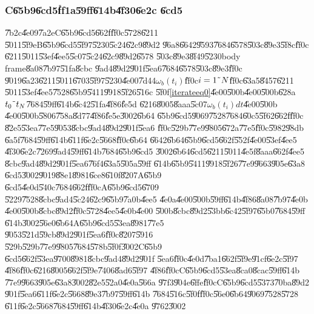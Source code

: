 \subsubsection{C\U{65b9}\U{6cd5}\U{ff1a}\U{59ff}\U{614b}\U{4f30}\U{6e2c}%
\U{6cd5}}

\U{7b2c}\U{4e09}\U{7a2e}C\U{65b9}\U{6cd5}\U{662f}\U{ff0c}\U{5728}\U{6211}%
\U{5011}\U{5f9e}B\U{65b9}\U{6cd5}\U{5f97}\U{5230}\U{5c24}\U{62c9}\U{89d2}%
\U{96a8}\U{6642}\U{9593}\U{7684}\U{6578}\U{503c}\U{89e3}\U{5f8c}\U{ff0c}%
\U{6211}\U{5011}\U{53ef}\U{4ee5}\U{5c07}\U{5c24}\U{62c9}\U{89d2}\U{6578}%
\U{503c}\U{89e3}\U{8f49}\U{5230}body frame\U{8a08}\U{7b97}\U{51fa}\U{8cbc}%
\U{9ad4}\U{89d2}\U{901f}\U{5ea6}\U{7684}\U{6578}\U{503c}\U{89e3}\U{ff0c}%
\U{9019}\U{6a23}\U{6211}\U{5011}\U{6703}\U{5f97}\U{5230}\U{4e00}\U{7d44}$%
\omega _{b}(t_{i})$\U{ff0c}$i=1\symbol{126}N$\U{ff0c}\U{63a5}\U{8457}\U{6211}%
\U{5011}\U{53ef}\U{4ee5}\U{7528}\U{65b9}\U{5411}\U{9918}\U{5f26}\U{516c}%
\U{5f0f}\ref{iterateeq0}\U{4e00}\U{500b}\U{4e00}\U{500b}\U{628a}$t_{0}%
\symbol{126}t_{N}$\U{7684}\U{59ff}\U{614b}\U{6c42}\U{51fa}\U{4f86}\U{fe5d}%
\U{6216}\U{8005}\U{8aaa}\U{5c07}$\omega _{b}(t_{i})dt$\U{4e00}\U{500b}%
\U{4e00}\U{500b}\U{5806}\U{758a}\U{8d77}\U{4f86}\U{fe5e}\U{3002}\U{6b64}%
\U{65b9}\U{6cd5}\U{9069}\U{7528}\U{7684}\U{60c5}\U{5f62}\U{662f}\U{ff0c}%
\U{82e5}\U{53ea}\U{77e5}\U{9053}\U{8cbc}\U{9ad4}\U{89d2}\U{901f}\U{5ea6}%
\U{ff0c}\U{529b}\U{77e9}\U{9805}\U{672a}\U{77e5}\U{ff0c}\U{5982}\U{98db}%
\U{6a5f}\U{7684}\U{59ff}\U{614b}\U{611f}\U{6e2c}\U{5668}\U{ff0c}\U{6b64}%
\U{6642}\U{6b64}\U{65b9}\U{6cd5}\U{662f}\U{552f}\U{4e00}\U{53ef}\U{4ee5}%
\U{4f30}\U{6e2c}\U{7269}\U{9ad4}\U{59ff}\U{614b}\U{7684}\U{65b9}\U{6cd5}%
\U{3002}\U{6b64}\U{6cd5}\U{6211}\U{5011}\U{4e5f}\U{8aaa}\U{662f}\U{4ee5}%
\U{8cbc}\U{9ad4}\U{89d2}\U{901f}\U{5ea6}\U{76f4}\U{63a5}\U{505a}\U{59ff}%
\U{614b}\U{65b9}\U{5411}\U{9918}\U{5f26}\U{77e9}\U{9663}\U{905e}\U{63a8}%
\U{6cd5}\U{3002}\U{9019}\U{88e1}\U{8981}\U{6ce8}\U{610f}\U{8207}A\U{65b9}%
\U{6cd5}\U{4e0d}\U{540c}\U{7684}\U{662f}\U{ff0c}A\U{65b9}\U{6cd5}\U{6709}%
\U{5229}\U{7528}\U{8cbc}\U{9ad4}\U{5c24}\U{62c9}\U{65b9}\U{7a0b}\U{4ee5}%
\U{4e0a}\U{4e00}\U{500b}\U{59ff}\U{614b}\U{4f86}\U{8a08}\U{7b97}\U{4e0b}%
\U{4e00}\U{500b}\U{8cbc}\U{89d2}\U{ff0c}\U{5728}\U{4ee5}\U{4e0b}\U{4e00}%
\U{500b}\U{8cbc}\U{89d2}\U{53bb}\U{6c42}\U{5f97}\U{65b0}\U{7684}\U{59ff}%
\U{614b}\U{3002}\U{56e0}\U{6b64}A\U{65b9}\U{6cd5}\U{53ea}\U{8981}\U{77e5}%
\U{9053}\U{521d}\U{59cb}\U{89d2}\U{901f}\U{5ea6}\U{ff0c}\U{8207}\U{5916}%
\U{529b}\U{529b}\U{77e9}\U{9805}\U{7684}\U{578b}\U{5f0f}\U{3002}C\U{65b9}%
\U{6cd5}\U{662f}\U{53ea}\U{9700}\U{8981}\U{8cbc}\U{9ad4}\U{89d2}\U{901f}%
\U{5ea6}\U{ff0c}\U{4e0d}\U{7ba1}\U{662f}\U{5f9e}\U{91cf}\U{6e2c}\U{5f97}%
\U{4f86}\U{ff0c}\U{6216}\U{8005}\U{662f}\U{5f9e}\U{7406}\U{8ad6}\U{5f97}%
\U{4f86}\U{ff0c}C\U{65b9}\U{6cd5}\U{53ea}\U{8ca0}\U{8cac}\U{59ff}\U{614b}%
\U{77e9}\U{9663}\U{905e}\U{63a8}\U{3002}\U{82e5}\U{52a0}\U{4e0a}\U{566a}%
\U{97f3}\U{904e}\U{6ffe}\U{ff0c}C\U{65b9}\U{6cd5}\U{5373}\U{70ba}\U{89d2}%
\U{901f}\U{5ea6}\U{611f}\U{6e2c}\U{5668}\U{89e3}\U{7b97}\U{59ff}\U{614b}%
\U{7684}\U{516c}\U{5f0f}\U{ff0c}\U{56e0}\U{6b64}\U{9069}\U{7528}\U{5728}%
\U{611f}\U{6e2c}\U{5668}\U{7684}\U{59ff}\U{614b}\U{4f30}\U{6e2c}\U{4e0a}%
\U{9762}\U{3002}

